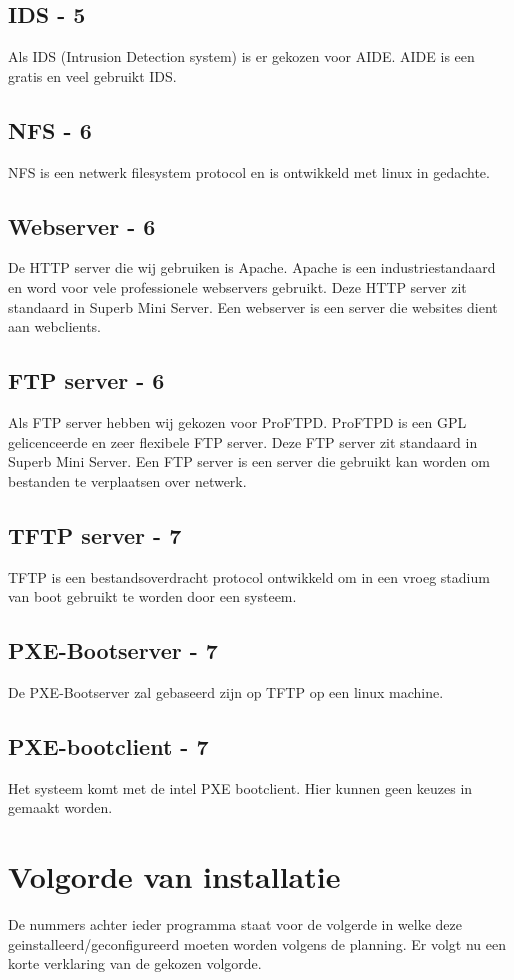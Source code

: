 \documentclass[12pt]{article}
\begin{document}
\subsection{IDS - 5}
Als IDS (Intrusion Detection system) is er gekozen voor AIDE. AIDE is een gratis en veel gebruikt IDS.
\subsection{NFS - 6}
NFS is een netwerk filesystem protocol en is ontwikkeld met linux in gedachte.
\subsection{Webserver - 6}
De HTTP server die wij gebruiken is Apache. Apache is een industriestandaard en word voor vele professionele webservers gebruikt. Deze HTTP server zit standaard in Superb Mini Server. Een webserver is een server die websites dient aan webclients.
\subsection{FTP server - 6}
Als FTP server hebben wij gekozen voor ProFTPD. ProFTPD is een GPL gelicenceerde en zeer flexibele FTP server. Deze FTP server zit standaard in Superb Mini Server. Een FTP server is een server die gebruikt kan worden om bestanden te verplaatsen over netwerk.
\subsection{TFTP server - 7}
TFTP is een bestandsoverdracht protocol ontwikkeld om in een vroeg stadium van boot gebruikt te worden door een systeem.
\subsection{PXE-Bootserver - 7}
De PXE-Bootserver zal gebaseerd zijn op TFTP op een linux machine.
\subsection{PXE-bootclient - 7}
Het systeem komt met de intel PXE bootclient. Hier kunnen geen keuzes in gemaakt worden.
\clearpage
\section{Volgorde van installatie}
De nummers achter ieder programma staat voor de volgerde in welke deze geinstalleerd/geconfigureerd moeten worden volgens de planning. Er volgt nu een korte verklaring van de gekozen volgorde.
\end{document}
